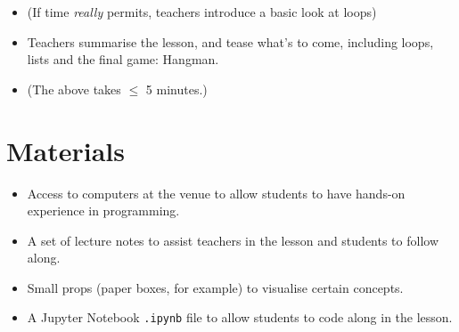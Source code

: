 \documentclass{article}
\def\T{Teachers }
\def\t{teachers }
\def\s{students }
\begin{document}
\begin{itemize}
\item (If time \textit{really} permits, \t introduce a basic look at loops)

\item \T summarise the lesson, and tease what's to come, including loops, lists and the final game: Hangman.

\item[] (The above takes $\leq$ 5 minutes.)
\end{itemize} 

\section*{Materials}

\begin{itemize}
\item Access to computers at the venue to allow \s to have hands-on experience in programming.
\item A set of lecture notes to assist \t in the lesson and \s to follow along.
\item Small props (paper boxes, for example) to visualise certain concepts.
\item A Jupyter Notebook \texttt{.ipynb} file to allow \s to code along in the lesson.
\end{itemize}
\end{document}
